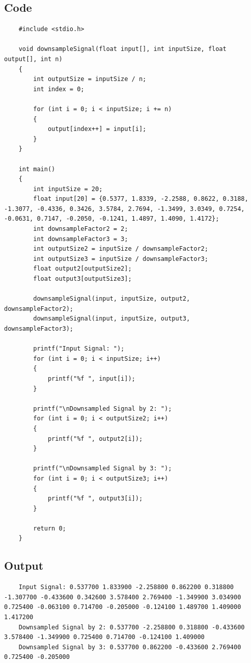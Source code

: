 \documentclass[a4paper,12pt]{article}
\begin{document}
\subsection*{Code}
\begin{lstlisting}
    #include <stdio.h>

    void downsampleSignal(float input[], int inputSize, float output[], int n)
    {
        int outputSize = inputSize / n;
        int index = 0;
    
        for (int i = 0; i < inputSize; i += n)
        {
            output[index++] = input[i];
        }
    }
    
    int main()
    {
        int inputSize = 20;
        float input[20] = {0.5377, 1.8339, -2.2588, 0.8622, 0.3188, -1.3077, -0.4336, 0.3426, 3.5784, 2.7694, -1.3499, 3.0349, 0.7254, -0.0631, 0.7147, -0.2050, -0.1241, 1.4897, 1.4090, 1.4172};
        int downsampleFactor2 = 2;
        int downsampleFactor3 = 3;
        int outputSize2 = inputSize / downsampleFactor2;
        int outputSize3 = inputSize / downsampleFactor3;
        float output2[outputSize2];
        float output3[outputSize3];
    
        downsampleSignal(input, inputSize, output2, downsampleFactor2);
        downsampleSignal(input, inputSize, output3, downsampleFactor3);
    
        printf("Input Signal: ");
        for (int i = 0; i < inputSize; i++)
        {
            printf("%f ", input[i]);
        }
    
        printf("\nDownsampled Signal by 2: ");
        for (int i = 0; i < outputSize2; i++)
        {
            printf("%f ", output2[i]);
        }
    
        printf("\nDownsampled Signal by 3: ");
        for (int i = 0; i < outputSize3; i++)
        {
            printf("%f ", output3[i]);
        }
    
        return 0;
    }

\end{lstlisting}

\subsection*{Output}

\begin{lstlisting}
    Input Signal: 0.537700 1.833900 -2.258800 0.862200 0.318800 -1.307700 -0.433600 0.342600 3.578400 2.769400 -1.349900 3.034900 0.725400 -0.063100 0.714700 -0.205000 -0.124100 1.489700 1.409000 1.417200 
    Downsampled Signal by 2: 0.537700 -2.258800 0.318800 -0.433600 3.578400 -1.349900 0.725400 0.714700 -0.124100 1.409000 
    Downsampled Signal by 3: 0.537700 0.862200 -0.433600 2.769400 0.725400 -0.205000
\end{lstlisting}
\end{document}
